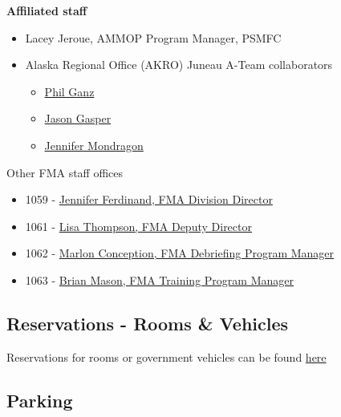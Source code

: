 \documentclass[
  letterpaper,
  DIV=11,
  numbers=noendperiod]{scrreprt}
\providecommand{\tightlist}{%
  \setlength{\itemsep}{0pt}\setlength{\parskip}{0pt}}\usepackage{longtable,booktabs,array}
\begin{document}
\textbf{Affiliated staff}

\begin{itemize}
\item
  Lacey Jeroue, AMMOP Program Manager, PSMFC\\
\item
  Alaska Regional Office (AKRO) Juneau A-Team collaborators

  \begin{itemize}
  \tightlist
  \item
    \href{https://www.fisheries.noaa.gov/contact/phil-ganz}{Phil Ganz}\\
  \item
    \href{https://www.fisheries.noaa.gov/contact/jason-gasper-phd}{Jason
    Gasper}\\
  \item
    \href{https://www.fisheries.noaa.gov/contact/jennifer-mondragon}{Jennifer
    Mondragon}
  \end{itemize}
\end{itemize}

Other FMA staff offices

\begin{itemize}
\tightlist
\item
  1059 -
  \href{https://www.fisheries.noaa.gov/contact/jennifer-ferdinand}{Jennifer
  Ferdinand, FMA Division Director}
\item
  1061 -
  \href{https://www.fisheries.noaa.gov/contact/lisa-thompson}{Lisa
  Thompson, FMA Deputy Director}
\item
  1062 -
  \href{https://www.fisheries.noaa.gov/contact/marlon-concepcion}{Marlon
  Conception, FMA Debriefing Program Manager}
\item
  1063 - \href{https://www.fisheries.noaa.gov/contact/brian-mason}{Brian
  Mason, FMA Training Program Manager}
\end{itemize}

\subsection{Reservations - Rooms \&
Vehicles}\label{reservations---rooms-vehicles}

Reservations for rooms or government vehicles can be found
\href{https://sites.google.com/noaa.gov/myafsc/reservations}{here}

\subsection{Parking}\label{parking}
\end{document}
